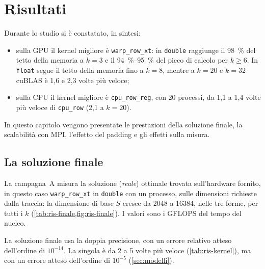 \documentclass[11pt,a4paper]{article}
\begin{document}
\section{Risultati}\label{sec:risultati}

Durante lo studio si è constatato, in sintesi:
\begin{itemize}
  \item sulla GPU il kernel migliore è \texttt{warp\_row\_xt}: in
        \texttt{double} raggiunge il \SI{98}{\percent} del tetto della memoria a
        $k = 3$ e il \SIrange{94}{95}{\percent} del picco di calcolo per $k \ge 6$. In \texttt{float} segue il tetto della memoria fino a $k = 8$, mentre a $k = 20$ e $k = 32$ cuBLAS è 1,6 e 2,3 volte più
        veloce;
  \item sulla CPU il kernel migliore è \texttt{cpu\_row\_reg}, con 20 processi,
        da 1,1 a 1,4 volte più veloce di \texttt{cpu\_row} (2,1 a $k = 20$).
\end{itemize}
In questo capitolo vengono presentate le prestazioni della soluzione finale, la scalabilità
con MPI, l'effetto del padding e gli effetti sulla
misura.

\subsection{La soluzione finale}\label{sec:ris-finale}

La campagna~A misura la soluzione (\emph{reale}) ottimale trovata sull'hardware fornito, in questo caso \texttt{warp\_row\_xt} in
\texttt{double} con un processo, sulle dimensioni richieste dalla traccia: la
dimensione di base $S$ cresce da 2048 a 16384, nelle tre forme, per tutti i $k$
(\cref{tab:ris-finale,fig:ris-finale}). I valori sono i GFLOPS del tempo del
nucleo.

La soluzione finale usa la doppia precisione, con un errore relativo atteso
dell'ordine di $10^{-14}$. La singola è da 2 a 5 volte più veloce
(\cref{tab:ris-kernel}), ma con un errore atteso dell'ordine di $10^{-5}$
(\cref{sec:modelli}).
\end{document}
